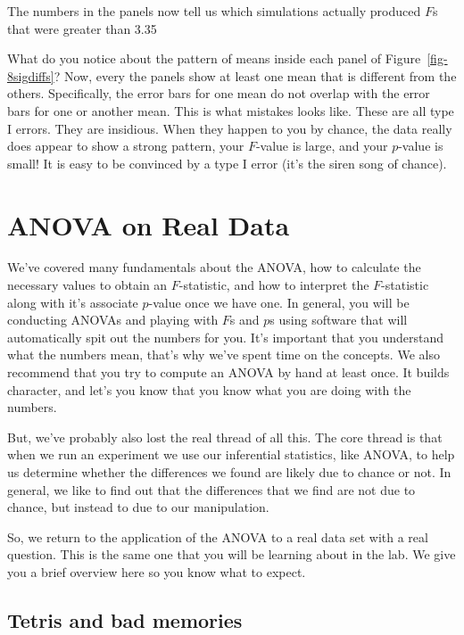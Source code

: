 \documentclass[
  letterpaper,
  DIV=11,
  numbers=noendperiod]{scrreprt}
\begin{document}
The numbers in the panels now tell us which simulations actually
produced \(F\)s that were greater than 3.35

What do you notice about the pattern of means inside each panel of
Figure~\ref{fig-8sigdiffs}? Now, every the panels show at least one mean
that is different from the others. Specifically, the error bars for one
mean do not overlap with the error bars for one or another mean. This is
what mistakes looks like. These are all type I errors. They are
insidious. When they happen to you by chance, the data really does
appear to show a strong pattern, your \(F\)-value is large, and your
\(p\)-value is small! It is easy to be convinced by a type I error (it's
the siren song of chance).

\section{ANOVA on Real Data}\label{anova-on-real-data}

We've covered many fundamentals about the ANOVA, how to calculate the
necessary values to obtain an \(F\)-statistic, and how to interpret the
\(F\)-statistic along with it's associate \(p\)-value once we have one.
In general, you will be conducting ANOVAs and playing with \(F\)s and
\(p\)s using software that will automatically spit out the numbers for
you. It's important that you understand what the numbers mean, that's
why we've spent time on the concepts. We also recommend that you try to
compute an ANOVA by hand at least once. It builds character, and let's
you know that you know what you are doing with the numbers.

But, we've probably also lost the real thread of all this. The core
thread is that when we run an experiment we use our inferential
statistics, like ANOVA, to help us determine whether the differences we
found are likely due to chance or not. In general, we like to find out
that the differences that we find are not due to chance, but instead to
due to our manipulation.

So, we return to the application of the ANOVA to a real data set with a
real question. This is the same one that you will be learning about in
the lab. We give you a brief overview here so you know what to expect.

\subsection{Tetris and bad memories}\label{tetris-and-bad-memories}
\end{document}
